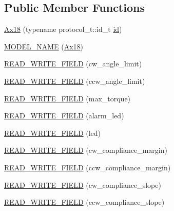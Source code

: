 \subsection*{Public Member Functions}
\begin{DoxyCompactItemize}
\item 
\hyperlink{classdynamixel_1_1servos_1_1_ax18_a58ee7bed2bf246c1a8bb7557b2b05cab}{Ax18} (typename protocol\+\_\+t\+::id\+\_\+t \hyperlink{classdynamixel_1_1servos_1_1_servo_a2d022081672e25a7bb57b76706e1cc57}{id})
\item 
\hyperlink{classdynamixel_1_1servos_1_1_ax18_a589278d427bfc731a8c5793be1b74fab}{M\+O\+D\+E\+L\+\_\+\+N\+A\+M\+E} (\hyperlink{classdynamixel_1_1servos_1_1_ax18}{Ax18})
\item 
\hyperlink{classdynamixel_1_1servos_1_1_ax18_a8a040ce8c16f94f55cbe148bd51faf2d}{R\+E\+A\+D\+\_\+\+W\+R\+I\+T\+E\+\_\+\+F\+I\+E\+L\+D} (cw\+\_\+angle\+\_\+limit)
\item 
\hyperlink{classdynamixel_1_1servos_1_1_ax18_a391b42df8bc701172c77c0176222e280}{R\+E\+A\+D\+\_\+\+W\+R\+I\+T\+E\+\_\+\+F\+I\+E\+L\+D} (ccw\+\_\+angle\+\_\+limit)
\item 
\hyperlink{classdynamixel_1_1servos_1_1_ax18_a678f214d64496523b40f4cbada31eda0}{R\+E\+A\+D\+\_\+\+W\+R\+I\+T\+E\+\_\+\+F\+I\+E\+L\+D} (max\+\_\+torque)
\item 
\hyperlink{classdynamixel_1_1servos_1_1_ax18_a367cf2bdc9a1101d8b72801b00db1bfc}{R\+E\+A\+D\+\_\+\+W\+R\+I\+T\+E\+\_\+\+F\+I\+E\+L\+D} (alarm\+\_\+led)
\item 
\hyperlink{classdynamixel_1_1servos_1_1_ax18_a55cf3996e099be27a82db1eb8add0c1b}{R\+E\+A\+D\+\_\+\+W\+R\+I\+T\+E\+\_\+\+F\+I\+E\+L\+D} (led)
\item 
\hyperlink{classdynamixel_1_1servos_1_1_ax18_a1e33e9e9216ab84479446c7453bd9393}{R\+E\+A\+D\+\_\+\+W\+R\+I\+T\+E\+\_\+\+F\+I\+E\+L\+D} (cw\+\_\+compliance\+\_\+margin)
\item 
\hyperlink{classdynamixel_1_1servos_1_1_ax18_acc0dbe2e32af3fd0e2f3a06f8f2cf6d0}{R\+E\+A\+D\+\_\+\+W\+R\+I\+T\+E\+\_\+\+F\+I\+E\+L\+D} (ccw\+\_\+compliance\+\_\+margin)
\item 
\hyperlink{classdynamixel_1_1servos_1_1_ax18_a1a98ea1bb1082cc07766a631934d9fa8}{R\+E\+A\+D\+\_\+\+W\+R\+I\+T\+E\+\_\+\+F\+I\+E\+L\+D} (cw\+\_\+compliance\+\_\+slope)
\item 
\hyperlink{classdynamixel_1_1servos_1_1_ax18_a01def36bc91208ebf98ca9d2a1e856c2}{R\+E\+A\+D\+\_\+\+W\+R\+I\+T\+E\+\_\+\+F\+I\+E\+L\+D} (ccw\+\_\+compliance\+\_\+slope)
\item 

\end{DoxyCompactItemize}
